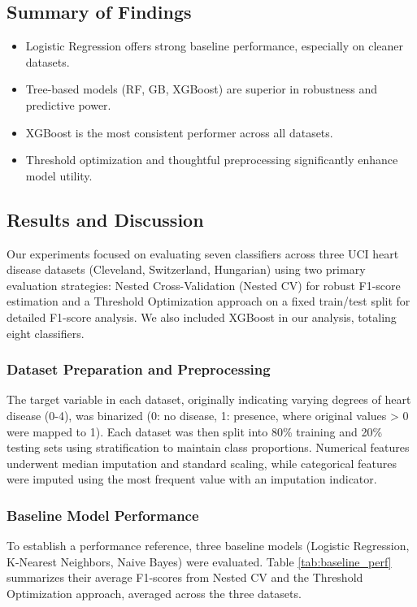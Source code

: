 \documentclass{article}
\begin{document}
\subsection{Summary of Findings}

\begin{itemize}
\item Logistic Regression offers strong baseline performance, especially on cleaner datasets.
\item Tree-based models (RF, GB, XGBoost) are superior in robustness and predictive power.
\item XGBoost is the most consistent performer across all datasets.
\item Threshold optimization and thoughtful preprocessing significantly enhance model utility.
\end{itemize}



\subsection{Results and Discussion}
Our experiments focused on evaluating seven classifiers across three UCI heart disease datasets (Cleveland, Switzerland, Hungarian) using two primary evaluation strategies: Nested Cross-Validation (Nested CV) for robust F1-score estimation and a Threshold Optimization approach on a fixed train/test split for detailed F1-score analysis. We also included XGBoost in our analysis, totaling eight classifiers.

\subsubsection{Dataset Preparation and Preprocessing}
The target variable in each dataset, originally indicating varying degrees of heart disease (0-4), was binarized (0: no disease, 1: presence, where original values > 0 were mapped to 1). Each dataset was then split into 80\% training and 20\% testing sets using stratification to maintain class proportions. Numerical features underwent median imputation and standard scaling, while categorical features were imputed using the most frequent value with an imputation indicator.

\subsubsection{Baseline Model Performance}
To establish a performance reference, three baseline models (Logistic Regression, K-Nearest Neighbors, Naive Bayes) were evaluated. Table \ref{tab:baseline_perf} summarizes their average F1-scores from Nested CV and the Threshold Optimization approach, averaged across the three datasets.
\end{document}
